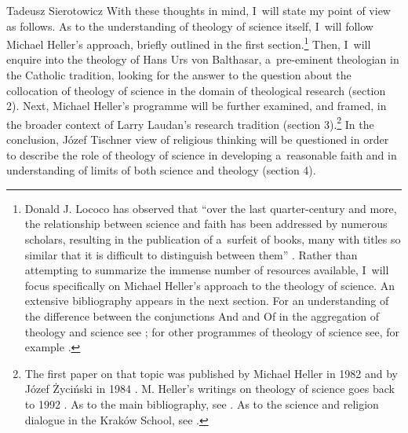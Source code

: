\begin{artengenv}{Tadeusz Sierotowicz}
With these thoughts in mind, I~will state my point of view as follows. As to the understanding of theology of science itself, I~will follow Michael Heller's approach, briefly outlined in the first section.\footnote{Donald J. Lococo has observed that ``over the last quarter-century and more, the relationship between science and faith has been addressed by numerous scholars, resulting in the publication of a~surfeit of books, many with titles so similar that it is difficult to distinguish between them'' 
\parencite[][p.10]{lococo_life_2021}. %
 Rather than attempting to summarize the immense number of resources available, I~will focus specifically on Michael Heller's approach to the theology of science. An extensive bibliography appears in the next section. For an understanding of the difference between the conjunctions And and Of in the aggregation of theology and science see 
\parencite[][pp.1–4]{tyson_christian_2022}; %
 for other programmes of theology of science see, for example 
\parencites[][]{lococo_towards_2002}[][]{lococo_life_2021}[][]{rodzen_teologia_2021}[][]{tyson_christian_2022}[][]{wilkinson_after_2022}.%
} Then, I~will enquire into the theology of Hans Urs von Balthasar, a~pre-eminent theologian in the Catholic tradition, looking for the answer to the question about the collocation of theology of science in the domain of theological research (section 2). Next, Michael Heller's programme will be further examined, and framed, in the broader context of Larry Laudan's research tradition (section 3).\footnote{The first paper on that topic was published by Michael Heller in 1982 and by Józef Życiński in 1984 
\parencites[][]{heller_stworzenie_1982}[][]{zycinski_w_1984}[see][]{polak_teologia_2015}[][]{rodzen_teologia_2021}. %
 M. Heller's writings on theology of science goes back to 1992 
\parencite[for an overview see][pp.759–760]{oleksowicz_we_2020}. %
 As to the main bibliography, see 
\parencites[][]{heller_new_1996}[][]{maczka_wstep_2015}[][]{macek_teologia_2014}[][]{maczka_teologia_2015}[][]{maziarka_w_2016}[][]{polak_teologia_2016}[][]{oleksowicz_we_2020}[][]{rodzen_teologia_2021}. %
 As to the science and religion dialogue in the Kraków School, see 
\parencites[][]{brozek_science_2015}[][]{obolevitch_relationship_2015}[][]{polak_science-religion_2021}[][]{polak_theory_2023}.%
} In the conclusion, Józef Tischner view of religious thinking will be questioned in order to describe the role of theology of science in developing a~reasonable faith and in understanding of limits of both science and theology (section 4).




\end{artengenv}
